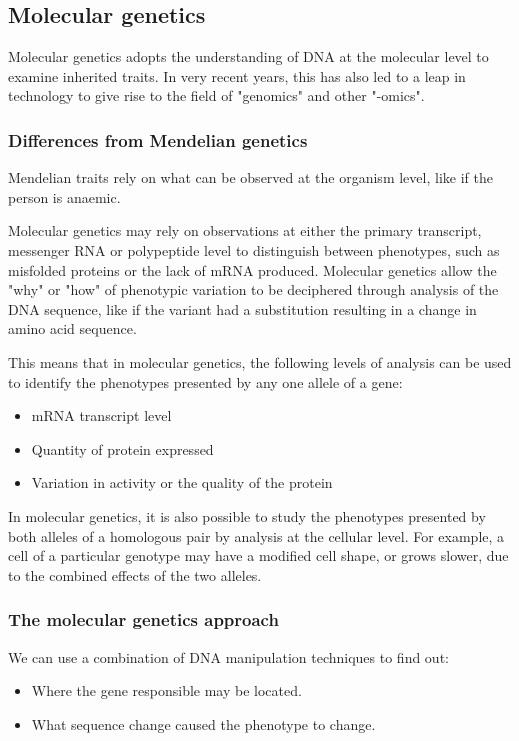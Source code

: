 \documentclass[11pt]{article}
\begin{document}
\subsection{Molecular genetics}
\label{sec:orgb795adc}
Molecular genetics adopts the understanding of DNA at the molecular level to examine inherited traits. In very recent years, this has also led to a leap in technology to give rise to the field of "genomics" and other "-omics".
\subsubsection{Differences from Mendelian genetics}
\label{sec:org8fdb74a}
Mendelian traits rely on what can be observed at the organism level, like if the person is anaemic.


Molecular genetics may rely on observations at either the primary transcript, messenger RNA or polypeptide level to distinguish between phenotypes, such as misfolded proteins or the lack of mRNA produced. Molecular genetics allow the "why" or "how" of phenotypic variation to be deciphered through analysis of the DNA sequence, like if the variant had a substitution resulting in a change in amino acid sequence.


This means that in molecular genetics, the following levels of analysis can be used to identify the phenotypes presented by any one allele of a gene:
\begin{itemize}
\item mRNA transcript level
\item Quantity of protein expressed
\item Variation in activity or the quality of the protein
\end{itemize}

In molecular genetics, it is also possible to study the phenotypes presented by both alleles of a homologous pair by analysis at the cellular level. For example, a cell of a particular genotype may have a modified cell shape, or grows slower, due to the combined effects of the two alleles.

\newpage
\subsubsection{The molecular genetics approach}
\label{sec:org20c6caf}
We can use a combination of DNA manipulation techniques to find out:
\begin{itemize}
\item Where the gene responsible may be located.
\item What sequence change caused the phenotype to change.
\end{itemize}
\end{document}
